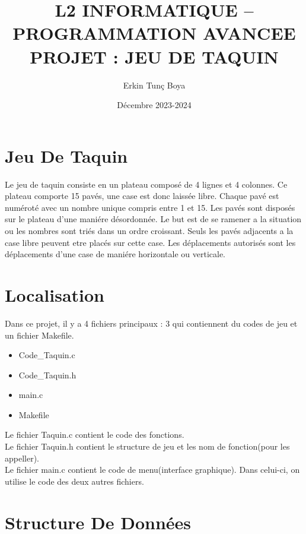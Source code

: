 \documentclass{article}
\title{L2 INFORMATIQUE – PROGRAMMATION AVANCEE \\ PROJET : JEU DE TAQUIN}
\author{Erkin Tunç Boya}
\date{Décembre 2023-2024}
\begin{document}
\maketitle
\tableofcontents
\newpage


\section{Jeu De Taquin}
Le jeu de taquin consiste en un
plateau composé de 4 lignes et 4 colonnes. Ce plateau comporte 15 pavés, une case est donc
laissée libre. Chaque pavé est numéroté avec un nombre unique compris entre 1 et 15.
Les pavés sont disposés sur le plateau d’une maniére désordonnée. Le but est de se ramener a la
situation ou les nombres sont triés dans un ordre croissant. Seuls les pavés adjacents a la case libre
peuvent etre placés sur cette case. Les déplacements autorisés sont les déplacements d’une case de
maniére horizontale ou verticale.


\section{Localisation}
Dans ce projet, il y a 4 fichiers principaux : 3 qui contiennent du codes de jeu et un fichier Makefile.
\\
\begin{itemize}
	\item Code\_Taquin.c
	\item Code\_Taquin.h
	\item main.c  \\
	\item Makefile \\
\end{itemize}


Le fichier Taquin.c contient le code des fonctions.
\\

Le fichier Taquin.h contient le structure de jeu et les nom de fonction(pour les appeller).\\

Le fichier main.c contient le code de menu(interface graphique). Dans celui-ci, on utilise le code des deux autres fichiers.


\section{Structure De Données}
\end{document}
